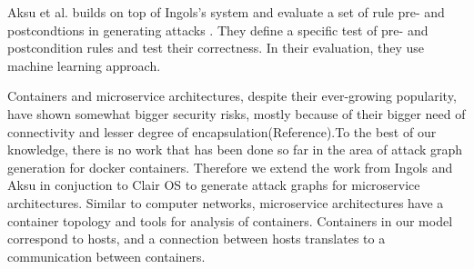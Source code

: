 Aksu et al. builds on top of Ingols's system and evaluate a set of rule pre- and postcondtions in generating attacks \cite{aksu2018automated}. They define a specific test of pre- and postcondition rules and test their correctness. In their evaluation, they use machine learning approach.

Containers and microservice architectures, despite their ever-growing popularity, have shown somewhat bigger security risks, mostly because of their bigger need of connectivity and lesser degree of encapsulation(Reference).To the best of our knowledge, there is no work that has been done so far in the area of attack graph generation for docker containers. Therefore we extend the work from Ingols \cite{ingols2006practical} and Aksu \cite{aksu2018automated} in conjuction to Clair OS to generate attack graphs for microservice architectures. Similar to computer networks, microservice architectures have a container topology and tools for analysis of containers. Containers in our model correspond to hosts, and a connection between hosts translates to a communication between containers. 

